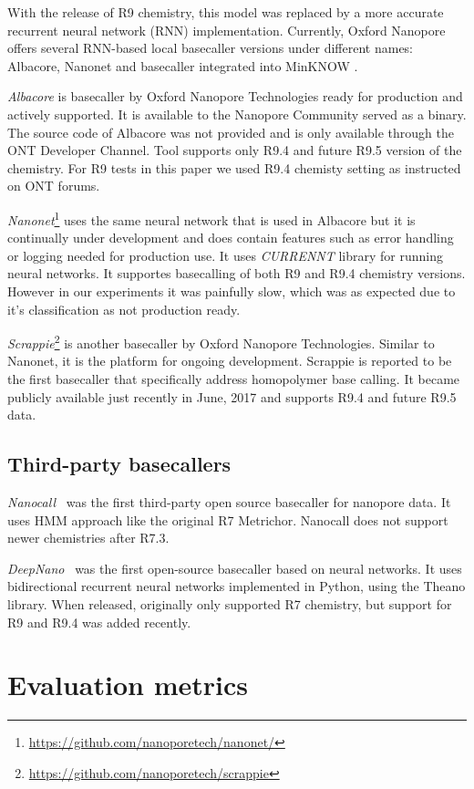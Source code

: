 \documentclass[runningheads,a4paper]{llncs}
\begin{document}
With the release of R9 chemistry, this model was replaced by a more accurate recurrent neural network (RNN) implementation. Currently, Oxford Nanopore offers several RNN-based local basecaller versions under different names: Albacore, Nanonet and basecaller integrated into MinKNOW \cite{ont-basecallers}.

\emph{Albacore} is basecaller by Oxford Nanopore Technologies ready for production and actively supported.
It is available to the Nanopore Community served as a binary. The source code of Albacore was not provided and is only available through the ONT Developer Channel. Tool supports only R9.4 and future R9.5 version of the chemistry. For R9 tests in this paper we used R9.4 chemisty setting as instructed on ONT forums.

\emph{Nanonet}\footnote{\url{https://github.com/nanoporetech/nanonet/}} uses the same neural network that is used in Albacore but it is continually under development and does contain features such as error handling or logging needed for production use. It uses \emph{CURRENNT} library for running neural networks. It supportes basecalling of both R9 and R9.4 chemistry versions. However in our experiments it was painfully slow, which was as expected due to it's classification as not production ready.

\emph{Scrappie}\footnote{\url{https://github.com/nanoporetech/scrappie}} is another basecaller by Oxford Nanopore Technologies. Similar to Nanonet, it is the platform for ongoing development. Scrappie is reported to be the first basecaller  that specifically address homopolymer base calling. It became publicly available just recently in June, 2017 and supports R9.4 and future R9.5 data.

\subsection{Third-party basecallers}
\emph{Nanocall}~\cite{David046086} was the first third-party open source basecaller for nanopore data. It uses HMM approach like the original R7 Metrichor. Nanocall does not support newer chemistries after R7.3.

\emph{DeepNano}~\cite{Boza2017}  was the first open-source basecaller based on neural networks. It uses bidirectional recurrent neural networks implemented in Python, using the Theano library. When released, originally only supported R7 chemistry, but support for R9 and R9.4 was added recently.

\section{Evaluation metrics}
\end{document}
